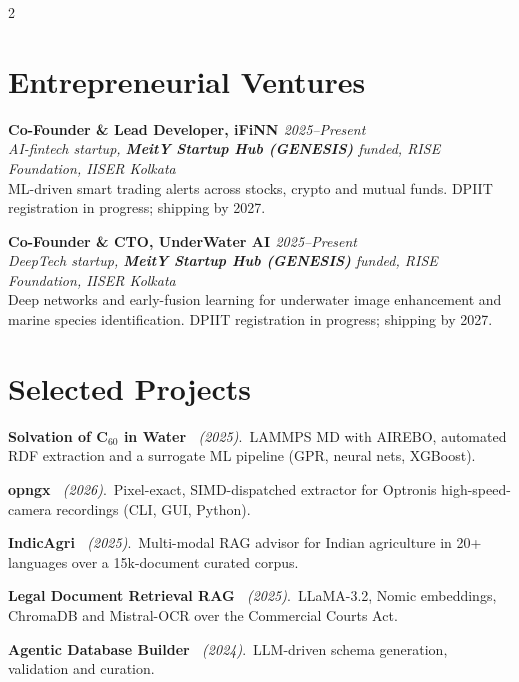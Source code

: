 \documentclass[a4paper,10.5pt]{extarticle}
\newcommand{\entryv}[4]{%
  {\normalsize\textbf{#1}}\hfill{\small\itshape\textcolor{mutedtext}{#2}}\\[0.04em]
  {\small\itshape\textcolor{mutedtext}{#3}}\\[0.04em]
  {\small #4}\par\vspace{3pt}%
}
\newcommand{\proj}[3]{{\small\textbf{#1}~{\itshape\textcolor{mutedtext}{(#2)}}.\ #3}\par\vspace{2.8pt}}
\begin{document}
\newpage
{}
\begin{paracol}{2}

\section{Entrepreneurial Ventures}

\entryv{Co-Founder \& Lead Developer, iFiNN \href{https://synapse-iiserk.github.io/}{\faGlobe}}{2025--Present}{AI-fintech startup, \textbf{MeitY Startup Hub (GENESIS)} funded, RISE Foundation, IISER Kolkata}{%
ML-driven smart trading alerts across stocks, crypto and mutual funds. DPIIT registration in progress; shipping by 2027.}

\entryv{Co-Founder \& CTO, UnderWater AI \href{https://underwater-ai.github.io/}{\faGlobe}}{2025--Present}{DeepTech startup, \textbf{MeitY Startup Hub (GENESIS)} funded, RISE Foundation, IISER Kolkata}{%
Deep networks and early-fusion learning for underwater image enhancement and marine species identification. DPIIT registration in progress; shipping by 2027.}

\section{Selected Projects}

\proj{Solvation of C$_{60}$ in Water \href{https://github.com/Shuvam-Banerji-Seal/Solvent-Structure-around-NanoParticles}{\faGithub}}{2025}{LAMMPS MD with AIREBO, automated RDF extraction and a surrogate ML pipeline (GPR, neural nets, XGBoost).}

\proj{opngx \href{https://github.com/Shuvam-Banerji-Seal/opngx}{\faGithub}}{2026}{Pixel-exact, SIMD-dispatched extractor for Optronis high-speed-camera recordings (CLI, GUI, Python).}

\proj{IndicAgri \href{https://github.com/Shuvam-Banerji-Seal/Answering_Agriculture}{\faGithub}}{2025}{Multi-modal RAG advisor for Indian agriculture in 20+ languages over a 15k-document curated corpus.}

\proj{Legal Document Retrieval RAG \href{https://github.com/Shuvam-Banerji-Seal/CCA-2015-LLM}{\faGithub}}{2025}{LLaMA-3.2, Nomic embeddings, ChromaDB and Mistral-OCR over the Commercial Courts Act.}

\proj{Agentic Database Builder \href{https://github.com/Shuvam-Banerji-Seal/Agentic_Database_Builder}{\faGithub}}{2024}{LLM-driven schema generation, validation and curation.}


\end{paracol}
\end{document}
